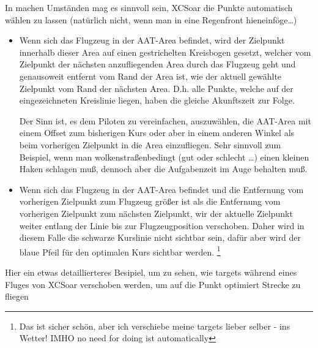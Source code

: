 In machen Umständen mag es sinnvoll sein, \textsf{XCSoar} die Punkte automatisch wählen zu lassen (natürlich nicht, wenn man in eine Regenfront hieneinföge\dots)
\begin{itemize}
\item Wenn sich das Flugzeug  in der AAT-Area befindet, wird der Zielpunkt innerhalb dieser Area auf einen gestrichelten
Kreisbogen  gesetzt, welcher vom Zielpunkt der nächsten anzufliegenden Area durch das Flugzeug geht und genausoweit entfernt vom Rand der Area ist,
wie der aktuell gewählte Zielpunkt vom Rand der  nächsten Area. D.h. alle Punkte, welche auf der eingezeichneten
Kreislinie liegen, haben die gleiche Akunftszeit zur Folge.

Der Sinn ist, es dem Piloten zu vereinfachen, auszuwählen, die AAT-Area mit einem Offset zum bisherigen Kurs oder aber in einem
anderen Winkel als beim vorherigen Zielpunkt in die Area einzufliegen. Sehr sinnvoll zum Beispiel, wenn man wolkenstraßenbedingt (gut oder schlecht \dots )
einen kleinen Haken schlagen muß, dennoch aber die Aufgabenzeit im Auge behalten muß.


\item Wenn sich das Flugzeug in der AAT-Area befindet und die Entfernung vom vorherigen Zielpunkt zum Flugzeug größer ist als die Entfernung vom vorherigen Zielpunkt zum nächsten Zielpunkt, wir der aktuelle Zielpunkt weiter entlang der Linie  bis zur Flugzeugposition verschoben.  Daher wird in diesem Falle die schwarze Kurslinie  nicht sichtbar sein, dafür aber wird der blaue Pfeil für den optimalen Kurs sichtbar werden. \footnote{Das ist sicher schön, aber ich verschiebe meine targets lieber selber - ins Wetter! IMHO no need for doing ist automatically}
\end{itemize}

Hier ein etwas detaillierteres Besipiel, um zu sehen, wie targets während  eines Fluges von \textsf{XCSoar} verschoben werden, um auf die Punkt optimiert Strecke zu fliegen

